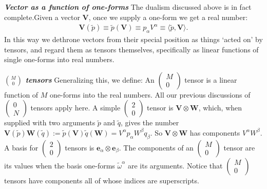 \documentclass[11pt,letterpaper]{book}
\begin{document}
    \textit{\textbf{Vector as a function of one-forms}}
    The dualism discussed above is in fact complete.Given a vector \(\mathbf{V}\), once we supply a one-form we get a real number:
    \begin{align}
    \mathbf{V}(\tilde{p}) \equiv \tilde{p}(\mathbf{V}) \equiv p_\alpha V^\alpha \equiv \langle \tilde{p}, \mathbf{V} \rangle. \tag{3.54}
    \end{align}
    In this way we dethrone vectors from their special position as things ‘acted on’ by tensors, and regard them as tensors themselves, specifically as linear functions of single one-forms into real numbers.
    
    \textit{\textbf{\(\binom{M}{0}\) tensors}}
    Generalizing this, we define:
    An \(\left(\begin{array}{c} M \\ 0 \end{array}\right)\) tensor is a linear function of \(M\) one-forms into the real numbers. All our previous discussions of \(\left(\begin{array}{c} 0 \\ N \end{array}\right)\) tensors apply here. A simple \(\left(\begin{array}{c} 2 \\ 0 \end{array}\right)\) tensor is \(\mathbf{V} \otimes \mathbf{W}\), which, when supplied with two arguments \(\tilde{p}\) and \(\tilde{q}\), gives the number \(\mathbf{V}(\tilde{p})\mathbf{W}(\tilde{q}) := \tilde{p}(\mathbf{V})\tilde{q}(\mathbf{W}) = V^\alpha p_\alpha W^\beta q_\beta\). So \(\mathbf{V} \otimes \mathbf{W}\) has components \(V^\alpha W^\beta\). A basis for \(\left(\begin{array}{c} 2 \\ 0 \end{array}\right)\) tensors is \(\mathbf{e}_\alpha \otimes \mathbf{e}_\beta\). The components of an \(\left(\begin{array}{c} M \\ 0 \end{array}\right)\) tensor are its values when the basis one-forms \(\tilde{\omega}^\alpha\) are its arguments. Notice that \(\left(\begin{array}{c} M \\ 0 \end{array}\right)\) tensors have components all of whose indices are superscripts.
\end{document}
